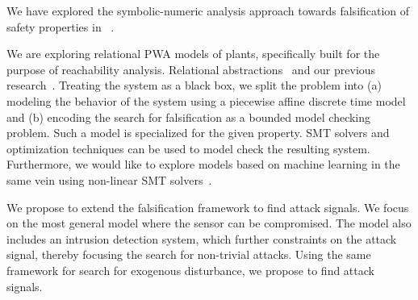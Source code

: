 We have explored the symbolic-numeric analysis approach towards
falsification of safety properties in ~\cite{}.



We are exploring relational PWA models of plants, specifically built
for the purpose of reachability analysis.  Relational
abstractions~\cite{Tiwari2012} and our previous
research~\cite{zutshi2012timed}. Treating the system as a black box,
we split the problem into (a) modeling the behavior of the system
using a piecewise affine discrete time model and (b) encoding the
search for falsification as a bounded model checking problem. Such a
model is specialized for the given property.  SMT solvers and
optimization techniques can be used to model check the resulting
system.  Furthermore, we would like to explore models based on machine
learning in the same vein using non-linear SMT
solvers~\cite{gao2013dreal}.



We propose to extend the falsification framework to find attack
signals. We focus on the most general model where the sensor can be
compromised. The model also includes an intrusion detection system,
which further constraints on the attack signal, thereby focusing the
search for non-trivial attacks.  Using the same framework for search
for exogenous disturbance, we propose to find attack signals.










